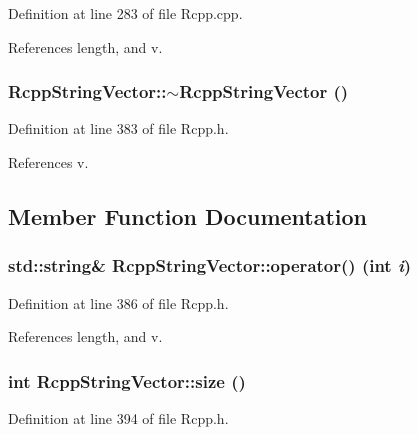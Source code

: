 Definition at line 283 of file Rcpp.cpp.

References length, and v.\hypertarget{classRcppStringVector_a1b0550e206ac6945b00ee02c3c4bf373}{
\subsubsection[{$\sim$RcppStringVector}]{\setlength{\rightskip}{0pt plus 5cm}RcppStringVector::$\sim$RcppStringVector ()}}
\label{classRcppStringVector_a1b0550e206ac6945b00ee02c3c4bf373}


Definition at line 383 of file Rcpp.h.

References v.

\subsection{Member Function Documentation}
\hypertarget{classRcppStringVector_aea5aa96f98f1c5b21e3c56ff60c7c413}{
\subsubsection[{operator()}]{\setlength{\rightskip}{0pt plus 5cm}std::string\& RcppStringVector::operator() (int {\em i})}}
\label{classRcppStringVector_aea5aa96f98f1c5b21e3c56ff60c7c413}


Definition at line 386 of file Rcpp.h.

References length, and v.\hypertarget{classRcppStringVector_ac52a8eb61411546a62a70636709b1172}{
\subsubsection[{size}]{\setlength{\rightskip}{0pt plus 5cm}int RcppStringVector::size ()}}
\label{classRcppStringVector_ac52a8eb61411546a62a70636709b1172}


Definition at line 394 of file Rcpp.h.

